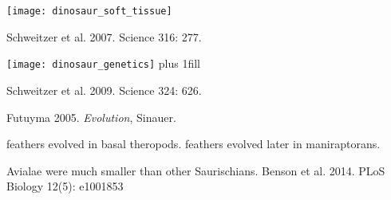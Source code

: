 \documentclass[t]{beamer}
\begin{document}
{
\begin{frame}[b,plain]
\end{frame}
}

{
\begin{frame}[b,plain]
\begin{center}
	\texttt{[image: dinosaur\_soft\_tissue]}
\end{center}
\vfill
\tiny\hfill Schweitzer et al. 2007. Science 316: 277.
\end{frame}
}

{
\begin{frame}[b,plain]
	\hspace{-1em}\texttt{[image: dinosaur\_genetics]}
\vskip0pt plus 1fill

\tiny\hfill Schweitzer et al. 2009. Science 324: 626.
\end{frame}
}

{
\begin{frame}[b,plain]
\tiny Futuyma 2005. \textit{Evolution}, Sinauer.
\end{frame}
}

{
\begin{frame}[b,plain]{ feathers evolved in basal theropods.  feathers evolved later in maniraptorans.}

\end{frame}
}

{
\begin{frame}[b,plain]
\end{frame}
}



{
\begin{frame}[b,plain]{Avialae were much smaller than other Saurischians.}
	\tiny Benson et al. 2014. PLoS Biology 12(5): e1001853
\end{frame}
}
\end{document}
